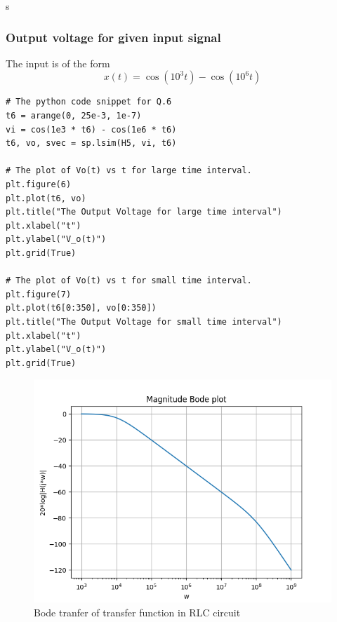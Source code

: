 s\documentclass{article}
\begin{document}
\subsubsection{Output voltage for given input signal}
The input is of the form
\begin{equation}
   x(t) = \cos{(10^3t)}-\cos{(10^6t)} 
\end{equation}
\begin{verbatim}
# The python code snippet for Q.6
t6 = arange(0, 25e-3, 1e-7)
vi = cos(1e3 * t6) - cos(1e6 * t6)
t6, vo, svec = sp.lsim(H5, vi, t6)

# The plot of Vo(t) vs t for large time interval.
plt.figure(6)
plt.plot(t6, vo)
plt.title("The Output Voltage for large time interval")
plt.xlabel("t")
plt.ylabel("V_o(t)")
plt.grid(True)

# The plot of Vo(t) vs t for small time interval.
plt.figure(7)
plt.plot(t6[0:350], vo[0:350])
plt.title("The Output Voltage for small time interval")
plt.xlabel("t")
plt.ylabel("V_o(t)")
plt.grid(True)
\end{verbatim}

\begin{figure}[!ht]
  \centering
  \includegraphics[scale=0.7]{Figure_4.png}
  \caption{Bode tranfer of transfer function in RLC circuit}
  \label{fig:sample}
  \end{figure}
  
\end{document}
